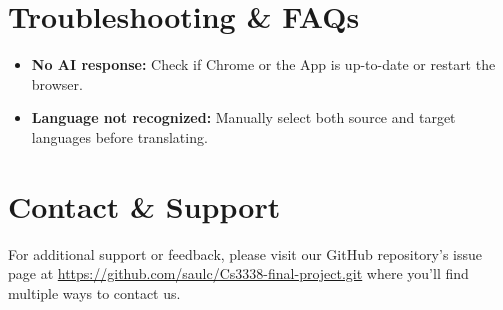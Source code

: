\documentclass{article}
\begin{document}
\section{Troubleshooting \& FAQs}
\begin{itemize}
    \item \textbf{No AI response:} Check if Chrome or the App is up-to-date or restart the browser.
    \item \textbf{Language not recognized:} Manually select both source and target languages before translating.
\end{itemize}

\section{Contact \& Support}
For additional support or feedback, please visit our GitHub repository’s issue page at \url{https://github.com/saulc/Cs3338-final-project.git}  where you'll find multiple ways to contact us.
\end{document}
